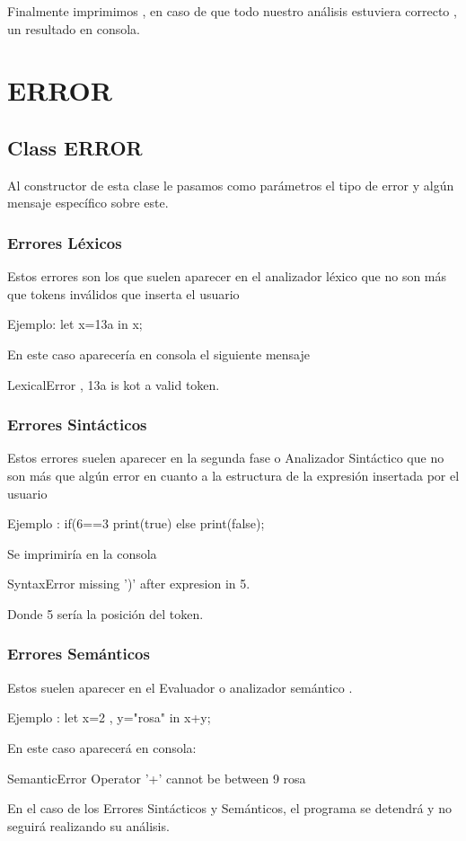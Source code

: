 \documentclass[a4paper,12pt]{article}
\begin{document}
 Finalmente imprimimos , en caso de que todo nuestro análisis estuviera correcto , un resultado en consola.

\section{ERROR}
\subsection{Class ERROR}
Al constructor de esta clase le pasamos como parámetros el tipo de error y algún mensaje específico sobre este.

\subsubsection{Errores Léxicos}
Estos errores son los que suelen aparecer en el analizador léxico que no son más que tokens inválidos que inserta el usuario 

Ejemplo: let x=13a in x; 

En este caso aparecería en consola el siguiente mensaje

LexicalError , 13a is kot a valid token.

\subsubsection{Errores Sintácticos}
Estos errores suelen aparecer en la segunda fase o Analizador Sintáctico que no son más que algún error en cuanto a la estructura de la expresión insertada por el usuario 

Ejemplo : if(6==3 print(true) else print(false);

Se imprimiría en la consola

SyntaxError missing ')' after expresion in 5.

Donde 5 sería la posición del token.

\subsubsection{Errores Semánticos}
Estos suelen aparecer en el Evaluador o analizador semántico .

Ejemplo : let x=2 , y="rosa" in x+y;

En este caso aparecerá en consola:

SemanticError Operator '+' cannot be between 9 rosa

En el caso de los Errores Sintácticos y Semánticos,  el programa se detendrá  y no seguirá realizando su análisis.
\end{document}
